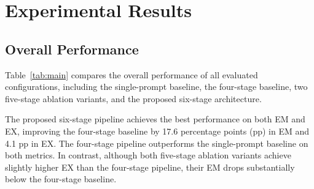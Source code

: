 \documentclass{svproc}
\begin{document}
\section{Experimental Results}
\label{sec:results}


\subsection{Overall Performance}
\label{subsec:overall}

Table~\ref{tab:main} compares the overall performance of all evaluated configurations, including the single-prompt baseline, the four-stage baseline, two five-stage ablation variants, and the proposed six-stage architecture.





The proposed six-stage pipeline achieves the best performance on both EM and EX, improving the four-stage baseline by 17.6 percentage points (pp) in EM and 4.1 pp in EX. The four-stage pipeline outperforms the single-prompt baseline on both metrics. In contrast, although both five-stage ablation variants achieve slightly higher EX than the four-stage pipeline, their EM drops substantially below the four-stage baseline.
\end{document}
